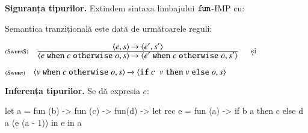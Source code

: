 \documentclass[addpoints,12pt,a4paper,answers]{exam}
\begin{document}
\begin{questions}
\vspace{-1ex}\question[3] \textbf{Siguranța tipurilor. }
Extindem sintaxa limbajului $\mathrel{\text{\ttfamily fun}}$-IMP cu:
\vspace{-1ex}\begin{syntaxBlock}{}
\end{syntaxBlock}

\vspace{-4ex}Semantica tranzițională este dată de următoarele reguli:

$\reg[SwhenS]{\Ss{\c{e \terminal{when} c \terminal{otherwise} o,s}}{\c{e' \terminal{when} c \terminal{otherwise} o,s'}}}{\Ss{\c{e,s}}{\c{e',s'}}}{}$
și

$\reg[Swhen]{\Ss{\c{v \terminal{when} c \terminal{otherwise} o,s}}{\c{\terminal{if} c \terminal{} v \terminal{then} v \terminal{else} o,s}}}{}{}$


\question[3\half] \textbf{Inferența tipurilor. }
Se dă expresia $e$:
\begin{asciiml}
let a = fun (b) -> fun (c) -> fun(d) ->
          let rec e = fun (a) -> if b a then c else d a (e (a - 1))
          in  e
in a
\end{asciiml}
\end{questions}
\end{document}
